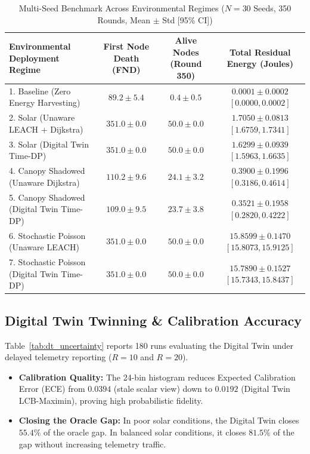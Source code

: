 \documentclass[journal]{IEEEtran}
\begin{document}
\begin{table}[!t]
\caption{Multi-Seed Benchmark Across Environmental Regimes ($N=30$ Seeds, 350 Rounds, Mean $\pm$ Std [95\% CI])}
\label{tab:dt_multi_seed}
\centering
\begin{tabular}{@{}lccc@{}}
\toprule
\textbf{Environmental Deployment Regime} & \textbf{First Node Death (FND)} & \textbf{Alive Nodes (Round 350)} & \textbf{Total Residual Energy (Joules)} \\
\midrule
1. Baseline (Zero Energy Harvesting) & $89.2 \pm 5.4$ & $0.4 \pm 0.5$ & $0.0001 \pm 0.0002$ $[0.0000, 0.0002]$ \\
2. Solar (Unaware LEACH + Dijkstra) & $351.0 \pm 0.0$ & $50.0 \pm 0.0$ & $\mathbf{1.7050 \pm 0.0813}$ $[1.6759, 1.7341]$ \\
3. Solar (Digital Twin Time-DP) & $351.0 \pm 0.0$ & $50.0 \pm 0.0$ & $1.6299 \pm 0.0939$ $[1.5963, 1.6635]$ \\
4. Canopy Shadowed (Unaware Dijkstra) & $\mathbf{110.2 \pm 9.6}$ & $\mathbf{24.1 \pm 3.2}$ & $\mathbf{0.3900 \pm 0.1996}$ $[0.3186, 0.4614]$ \\
5. Canopy Shadowed (Digital Twin Time-DP) & $109.0 \pm 9.5$ & $23.7 \pm 3.8$ & $0.3521 \pm 0.1958$ $[0.2820, 0.4222]$ \\
6. Stochastic Poisson (Unaware LEACH) & $351.0 \pm 0.0$ & $50.0 \pm 0.0$ & $\mathbf{15.8599 \pm 0.1470}$ $[15.8073, 15.9125]$ \\
7. Stochastic Poisson (Digital Twin Time-DP) & $351.0 \pm 0.0$ & $50.0 \pm 0.0$ & $15.7890 \pm 0.1527$ $[15.7343, 15.8437]$ \\
\bottomrule
\end{tabular}
\end{table}

\subsection{Digital Twin Twinning & Calibration Accuracy}
Table~\ref{tab:dt_uncertainty} reports 180 runs evaluating the Digital Twin under delayed telemetry reporting ($R=10$ and $R=20$).
\begin{itemize}
    \item \textbf{Calibration Quality:} The 24-bin histogram reduces Expected Calibration Error (ECE) from $0.0394$ (stale scalar view) down to $\mathbf{0.0192}$ (Digital Twin LCB-Maximin), proving high probabilistic fidelity.
    \item \textbf{Closing the Oracle Gap:} In poor solar conditions, the Digital Twin closes $\mathbf{55.4\%}$ of the oracle gap. In balanced solar conditions, it closes $\mathbf{81.5\%}$ of the gap without increasing telemetry traffic.
\end{itemize}
\end{document}
